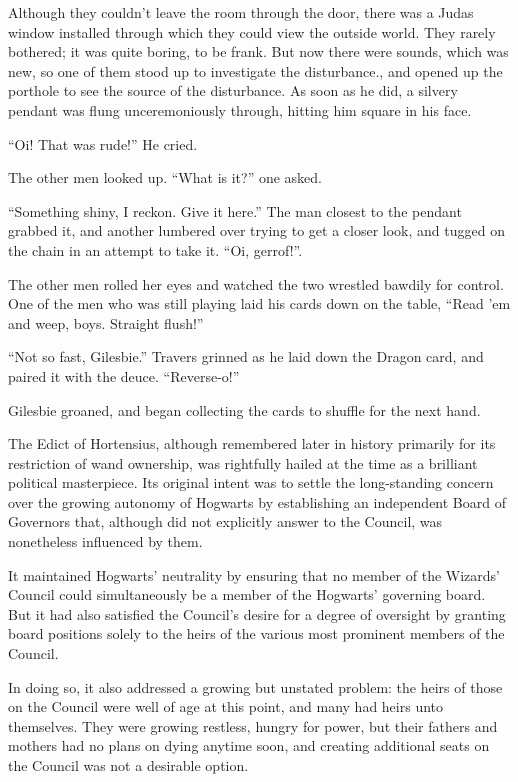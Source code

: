 Although they couldn’t leave the room through the door, there was a Judas window installed through which they could view the outside world. They rarely bothered; it was quite boring, to be frank. But now there were sounds, which was new, so one of them stood up to investigate the disturbance., and opened up the porthole to see the source of the disturbance. As soon as he did, a silvery pendant was flung unceremoniously through, hitting him square in his face.

“Oi! That was rude!” He cried.

The other men looked up. “What is it?” one asked.

“Something shiny, I reckon. Give it here.” The man closest to the pendant grabbed it, and another lumbered over trying to get a closer look, and tugged on the chain in an attempt to take it. “Oi, gerrof!”.

The other men rolled her eyes and watched the two wrestled bawdily for control. One of the men who was still playing laid his cards down on the table, “Read ’em and weep, boys. Straight flush!”

“Not so fast, Gilesbie.” Travers grinned as he laid down the Dragon card, and paired it with the deuce. “Reverse-o!”

Gilesbie groaned, and began collecting the cards to shuffle for the next hand.
\simpleline

The Edict of Hortensius, although remembered later in history primarily for its restriction of wand ownership, was rightfully hailed at the time as a brilliant political masterpiece. Its original intent was to settle the long-standing concern over the growing autonomy of Hogwarts by establishing an independent Board of Governors that, although did not explicitly answer to the Council, was nonetheless influenced by them.

It maintained Hogwarts’ neutrality by ensuring that no member of the Wizards’ Council could simultaneously be a member of the Hogwarts’ governing board. But it had also satisfied the Council’s desire for a degree of oversight by granting board positions solely to the heirs of the various most prominent members of the Council.

In doing so, it also addressed a growing but unstated problem: the heirs of those on the Council were well of age at this point, and many had heirs unto themselves. They were growing restless, hungry for power, but their fathers and mothers had no plans on dying anytime soon, and creating additional seats on the Council was not a desirable option.


